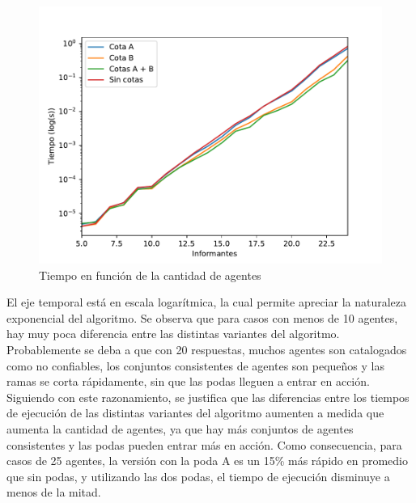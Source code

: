 \documentclass{article}
\begin{document}
\begin{figure}[h]
\caption{Tiempo en función de la cantidad de agentes}
\centering
\includegraphics[scale=0.5]{Agentes_st.pdf}
\end{figure}

El eje temporal está en escala logarítmica, la cual permite apreciar la naturaleza exponencial del algoritmo. 
Se observa que para casos con menos de 10 agentes, hay muy poca diferencia entre las distintas variantes del algoritmo. Probablemente se deba a que con 20 respuestas, muchos agentes son catalogados como no confiables, los conjuntos consistentes de agentes son pequeños y las ramas se corta rápidamente, sin que las podas lleguen a entrar en acción. 
Siguiendo con este razonamiento, se justifica que las diferencias entre los tiempos de ejecución de las distintas variantes del algoritmo aumenten a medida que aumenta la cantidad de agentes, ya que hay más conjuntos de agentes consistentes y las podas pueden entrar más en acción. Como consecuencia, para casos de 25 agentes, la versión con la poda A es un 15\% más rápido en promedio que sin podas, y utilizando las dos podas, el tiempo de ejecución disminuye a menos de la mitad.
\end{document}
